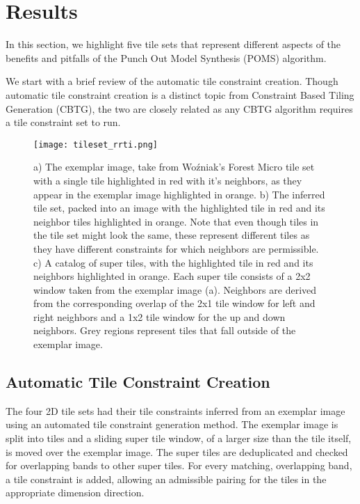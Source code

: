 \section{Results}

In this section, we highlight five tile sets that represent different aspects of the
benefits and pitfalls of the Punch Out Model Synthesis (POMS) algorithm.

We start with a brief review of the automatic tile constraint creation.
Though automatic tile constraint creation is a distinct topic from Constraint Based
Tiling Generation (CBTG), the two are closely related as any CBTG algorithm requires
a tile constraint set to run.

\begin{figure}[h]
  \texttt{[image: tileset\_rrti.png]}
  \caption{a) The exemplar image, take from Wo\'zniak's Forest Micro tile set with a single tile highlighted in red with it's neighbors, as they appear in
           the exemplar image highlighted in orange.
           b) The inferred tile set, packed into an image with the highlighted tile in red and its neighbor tiles highlighted in orange. Note that even though
           tiles in the tile set might look the same, these represent different tiles as they have different constraints for which neighbors are permissible.
           c) A catalog of super tiles, with the highlighted tile in red and its neighbors highlighted in orange. Each super tile consists of a 2x2 window
           taken from the exemplar image (a). Neighbors are derived from the corresponding overlap of the 2x1 tile window  for left and right neighbors and
           a 1x2 tile window for the up and down neighbors. Grey regions represent tiles that fall outside of the exemplar image. }
  \label{fig:rrti_tileset}
\end{figure}


\subsection{Automatic Tile Constraint Creation}

The four 2D tile sets had their tile constraints inferred from an exemplar image using
an automated tile constraint generation method.
The exemplar image is split into tiles and a sliding super tile window, of a larger size than the tile itself, is moved over the exemplar image.
The super tiles are deduplicated and checked for overlapping bands to other super tiles.
For every matching, overlapping band, a tile constraint is added, allowing an admissible pairing for the tiles in the
appropriate dimension direction.

